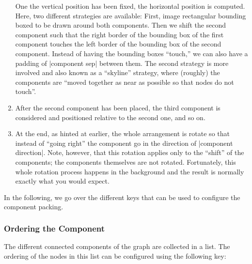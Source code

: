 \begin{enumerate}
  One the vertical position has been fixed, the horizontal position is
  computed. Here, two different strategies are available: First, image
  rectangular bounding boxed to be drawn around both components. Then
  we shift the second component such that the right border of the
  bounding box of the first component touches the left border of the
  bounding box of the second component. Instead of having the bounding
  boxes ``touch,'' we can also have a padding of |component sep|
  between them. The second strategy is more involved and also known as
  a ``skyline'' strategy, where (roughly) the components are ``moved together as
  near as possible so that nodes do not touch''. 
\item
  After the second component has been placed, the third component is
  considered and positioned relative to the second one, and so on.
\item
  At the end, as hinted at earlier, the whole arrangement is rotate so
  that instead of ``going right'' the component go in the direction of
  |component direction|. Note, however, that this rotation applies only
  to the ``shift'' of the components; the components themselves are
  not rotated. Fortunately, this whole rotation process happens in the
  background and the result is normally exactly what you would expect.
\end{enumerate}

In the following, we go over the different keys that can be used to
configure the component packing.


\subsubsection{Ordering the Component}

The different connected components of the graph are collected in a
list. The ordering of the nodes in this list can be configured using
the following key:

